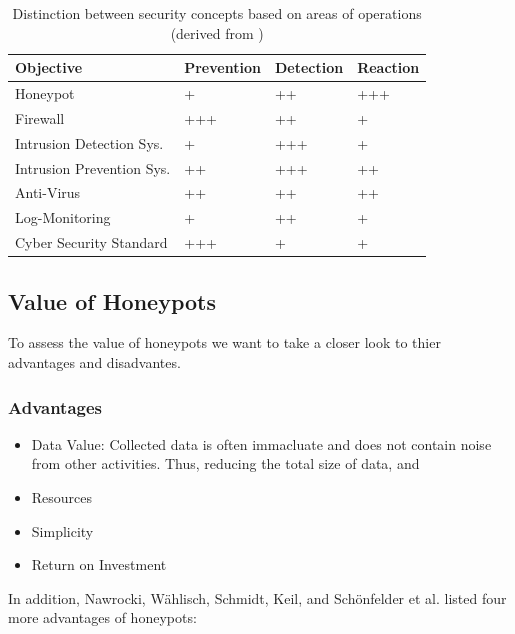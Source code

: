\begin{table}[h]
    \centering
    \caption{Distinction between security concepts based on areas of operations (derived from \cite{NawrockiWSKS2016})}
    \begin{tabular}{l|lll}
        Objective                 & Prevention & Detection & Reaction \\ \hline
        Honeypot                  & +          & ++        & +++      \\
        Firewall                  & +++        & ++        & +        \\
        Intrusion Detection Sys.  & +          & +++       & +        \\
        Intrusion Prevention Sys. & ++         & +++       & ++       \\
        Anti-Virus                & ++         & ++        & ++       \\
        Log-Monitoring            & +          & ++        & +        \\
        Cyber Security Standard   & +++        & +         & +        \\
    \end{tabular}
    \label{tab:honeypots-security-concepts}
\end{table}

\subsection{Value of Honeypots}

To assess the value of honeypots we want to take a closer look to thier advantages and disadvantes.\cite{Mokube2007} \cite{Kaur2014} \cite{Spitzner2003}

\subsubsection{Advantages}

\begin{itemize}
    \item Data Value: Collected data is often immacluate and does not contain noise from other activities. Thus, reducing the total size of data, and 
    \item Resources
    \item Simplicity
    \item Return on Investment
\end{itemize}

In addition, Nawrocki, Wählisch, Schmidt, Keil, and Schönfelder et al. \cite{NawrockiWSKS2016} listed four more advantages of honeypots:

